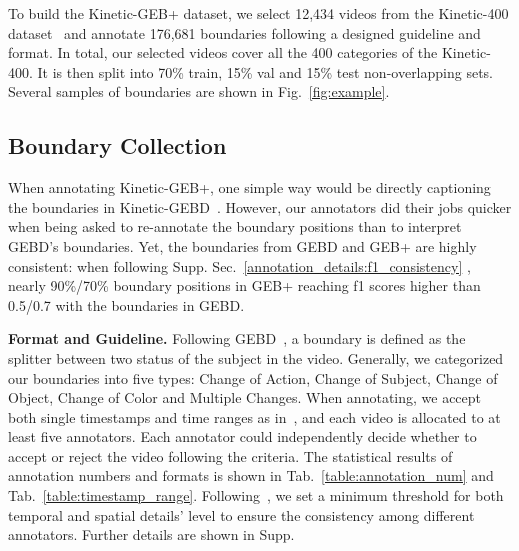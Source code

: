 \documentclass[runningheads]{llncs}
\begin{document}
To build the Kinetic-GEB+ dataset, we select 12,434 videos from the Kinetic-400 dataset~\cite{kay2017kinetics} and annotate 176,681 boundaries following a designed guideline and format. In total, our selected videos cover all the 400 categories of the Kinetic-400. It is then split into 70\% train, 15\% val and 15\% test non-overlapping sets. Several samples of boundaries are shown in Fig.~\ref{fig:example}.


\subsection{Boundary Collection}
\label{benchmark_bdycollect}


When annotating Kinetic-GEB+, one simple way would be directly captioning the boundaries in Kinetic-GEBD~\cite{shou2021generic}. 
However, our annotators did their jobs quicker when being asked to re-annotate the boundary positions than to interpret GEBD's boundaries. 
Yet, the boundaries from GEBD and GEB+ are highly consistent: when following Supp. Sec.~\ref{annotation_details:f1_consistency}
, nearly 90\%/70\% boundary positions in GEB+ reaching f1 scores higher than 0.5/0.7 with the boundaries in GEBD.


\textbf{Format and Guideline.}
Following GEBD~\cite{shou2021generic}, a boundary is defined as the splitter between two status of the subject in the video. 
Generally, we categorized our boundaries into five types: Change of Action, Change of Subject, Change of Object, Change of Color and Multiple Changes.
When annotating, we accept both single timestamps and time ranges as in~\cite{shou2021generic}, and each video is allocated to at least five annotators. 
Each annotator could independently decide whether to accept or reject the video following the criteria. 
The statistical results of annotation numbers and formats is shown in Tab.~\ref{table:annotation_num} and Tab.~\ref{table:timestamp_range}. Following~\cite{shou2021generic}, we set a minimum threshold for both temporal and spatial details’ level to ensure the consistency among different annotators. Further details are shown in Supp.
\end{document}
